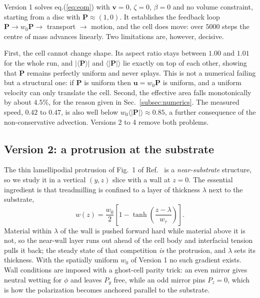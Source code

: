 \documentclass[11pt]{article}
\begin{document}
Version 1 solves eq.(\ref{eq:eom}) with $\mathbf{v}=0$, $\zeta=0$, $\beta=0$ and
no volume constraint, starting from a disc with $\mathbf{P}\approx(1,0)$. It
establishes the feedback loop $\mathbf{P}\rightarrow w_{0}\mathbf{P}\rightarrow$
transport $\rightarrow$ motion, and the cell does move: over $5000$ steps the
centre of mass advances linearly. Two limitations are, however, decisive.

First, the cell cannot change shape. Its aspect ratio stays between $1.00$ and
$1.01$ for the whole run, and $|\langle\mathbf{P}\rangle|$ and
$\langle|\mathbf{P}|\rangle$ lie exactly on top of each other, showing that
$\mathbf{P}$ remains perfectly uniform and never splays. This is not a numerical
failing but a structural one: if $\mathbf{P}$ is uniform then
$\mathbf{u}=w_{0}\mathbf{P}$ is uniform, and a uniform velocity can only
translate the cell. Second, the effective area falls monotonically by about
$4.5\%$, for the reason given in Sec.~\ref{subsec:numerics}. The measured speed,
$0.42$ to $0.47$, is also well below $w_{0}\langle|\mathbf{P}|\rangle\approx0.85$,
a further consequence of the non-conservative advection. Versions 2 to 4 remove
both problems.

\subsection{Version 2: a protrusion at the substrate}
\label{sec:v2}

The thin lamellipodial protrusion of Fig.~1 of Ref.~\cite{Tjhung:2015} is a
\textit{near-substrate} structure, so we study it in a vertical $(y,z)$ slice
with a wall at $z=0$. The essential ingredient is that treadmilling is confined
to a layer of thickness $\lambda$ next to the substrate,
\begin{equation}\label{eq:wz}
w(z)=\frac{w_{0}}{2}\left[1-\tanh\left(\frac{z-\lambda}{w_\tau}\right)\right].
\end{equation}
Material within $\lambda$ of the wall is pushed forward hard while material above
it is not, so the near-wall layer runs out ahead of the cell body and interfacial
tension pulls it back; the steady state of that competition \textit{is} the
protrusion, and $\lambda$ sets its thickness. With the spatially uniform $w_{0}$
of Version 1 no such gradient exists. Wall conditions are imposed with a
ghost-cell parity trick: an even mirror gives neutral wetting for $\phi$ and
leaves $P_y$ free, while an odd mirror pins $P_z=0$, which is how the
polarization becomes anchored parallel to the substrate.
\end{document}
